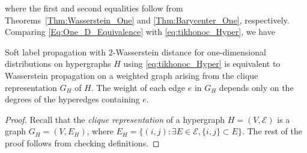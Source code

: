 \documentclass[letterpaper]{article} %
\begin{document}
where the first and second equalities follow from Theorems~\ref{Thm:Wasserstein_One} and \ref{Thm:Barycenter_One}, respectively. Comparing \eqref{Eq:One_D_Equivalence} with \eqref{eq:tikhonoc_Hyper}, we have
\begin{proposition}
  \label{prop:clique-equivalence}
  Soft label propagation with $2$-Wasserstein distance for one-dimensional distributions on hypergraphs $H$ using \eqref{eq:tikhonoc_Hyper} is equivalent to Wasserstein propagation on a weighted graph arising from the clique representation $G_H$ of $H$. The weight of each edge $e$ in $G_H$ depends only on the degrees of the hyperedges containing $e$.
\end{proposition}
\begin{proof}
Recall that the \textit{clique representation} of a hypergraph $H=(V, \mathcal E)$ is a graph $G_H=(V, E_H)$, where $E_H=\{(i, j):\exists E\in \mathcal E, \{i, j\}\subset E\}$. The rest of the proof follows from checking definitions.
\end{proof}

\end{document}
